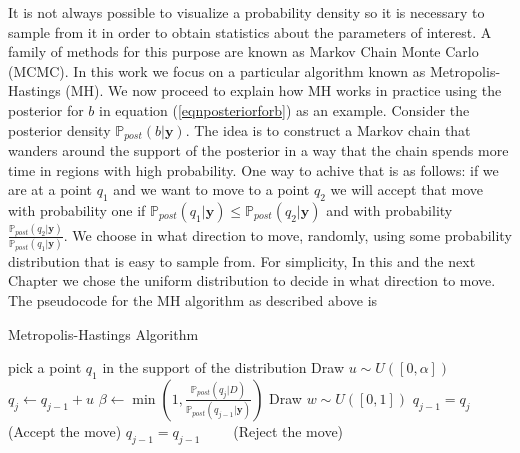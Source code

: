 \documentclass[12pt]{book}
\newcommand{\post}{\mathbb{P}_{post}}
\newcommand{\y}{\textbf{y}}
\begin{document}
It is not always possible to visualize a probability density so it is necessary to sample from it
in order to obtain statistics about the parameters of interest.
A family of methods for this purpose
are known as Markov Chain Monte Carlo (MCMC). In this work we 
focus on a particular algorithm known as Metropolis-Hastings  (MH). We now proceed  to explain
how MH works in practice using the posterior for $b$ in equation (\ref{eqnposteriorforb}) as an example. 
\newline
\newline
Consider the posterior density $\post(b|\y)$. The idea is to construct a Markov chain that wanders 
around the support of the posterior
in a way that the chain spends more time in regions with high probability.
One way to achive that is as follows: if we are at a point $q_{1}$ and we want to move to a point $q_{2}$ 
we will accept 
that move with probability one if $\post(q_{1}|\y)\leq\post(q_{2}|\y)$ and with probability 
$\frac{\post(q_{2}|\y)}{\post(q_{1}|\y)}$.  We choose
in what direction to move, randomly, using some probability distribution that is easy to sample from.
For simplicity, In this and the next Chapter we chose the uniform distribution to decide in what  direction to move.
The pseudocode  for the MH algorithm as described above is \cite{Somersalo}

\begin{algorithm}\label{algMH}
\caption{Metropolis-Hastings Algorithm}
\begin{algorithmic}[1]\label{algMH}
\State pick a point $q_{1}$ in the support of the distribution
\State Draw $u\sim U([0,\alpha])$
\State $q_{j}\leftarrow q_{j-1}+u$
\State $\beta\leftarrow\min(1,\frac{\post(q_{j}|D)}{\post(q_{j-1}|\y)})$
\State Draw $w\sim U([0,1])$
\State $q_{j-1}=q_{j}\qquad$   (Accept the move)
\Else
\State $q_{j-1}=q_{j-1}\qquad$ (Reject the move)
\EndIf
\EndFor
\end{algorithmic}
\end{algorithm}
\end{document}
